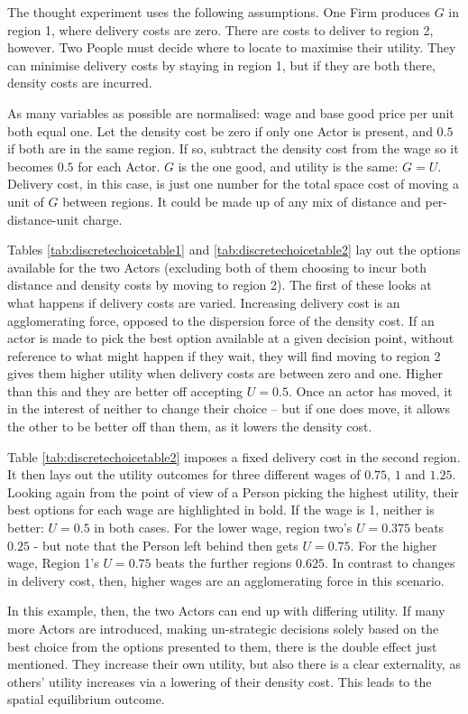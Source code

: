 The thought experiment uses the following assumptions. One Firm produces $G$ in region 1, where delivery costs are zero. There are costs to deliver to region 2, however. Two People must decide where to locate to maximise their utility. They can minimise delivery costs by staying in region 1, but if they are both there, density costs are incurred. 

As many variables as possible are normalised: wage and base good price per unit both equal one. Let the density cost be zero if only one Actor is present, and $0.5$ if both are in the same region. If so, subtract the density cost from the wage so it becomes $0.5$ for each Actor. $G$ is the one good, and utility is the same: $G = U$. Delivery cost, in this case, is just one number for the total space cost of moving a unit of $G$ between regions. It could be made up of any mix of distance and per-distance-unit charge.

Tables \ref{tab:discretechoicetable1} and \ref{tab:discretechoicetable2} lay out the options available for the two Actors (excluding both of them choosing to incur both distance and density costs by moving to region 2). The first of these looks at what happens if delivery costs are varied. Increasing delivery cost is an agglomerating force, opposed to the dispersion force of the density cost. If an actor is made to pick the best option available at a given decision point, without reference to what might happen if they wait, they will find moving to region 2 gives them higher utility when delivery costs are between zero and one. Higher than this and they are better off accepting $U=0.5$. Once an actor has moved, it in the interest of neither to change their choice – but if one does move, it allows the other to be better off than them, as it lowers the density cost.

Table \ref{tab:discretechoicetable2} imposes a fixed delivery cost in the second region. It then lays out the utility outcomes for three different wages of $0.75$, $1$ and $1.25$. Looking again from the point of view of a Person picking the highest utility, their best options for each wage are highlighted in bold. If the wage is 1, neither is better: $U=0.5$ in both cases. For the lower wage, region two’s $U=0.375$ beats $0.25$ - but note that the Person left behind then gets $U=0.75$. For the higher wage, Region 1’s $U=0.75$ beats the further regions $0.625$. In contrast to changes in delivery cost, then, higher wages are an agglomerating force in this scenario. 

In this example, then, the two Actors can end up with differing utility. If many more Actors are introduced, making un-strategic decisions solely based on the best choice from the options presented to them, there is the double effect just mentioned.  They increase their own utility, but also there is a clear externality, as others’ utility increases via a lowering of their density cost. This leads to the spatial equilibrium outcome. 

